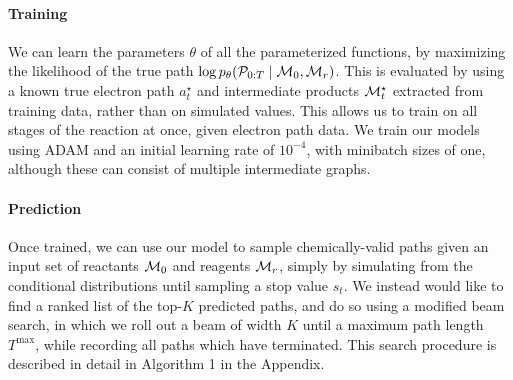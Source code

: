 \paragraph{Training}
We can learn the parameters $\theta$ of all the parameterized functions, by maximizing the likelihood of the true path $\log p_\theta({\mathcal{P}}_{0:T} \mid {\mathcal{M}}_0, {\mathcal{M}}_r)$.
This is evaluated by using a known true electron path $a_t^\star$ and intermediate products ${\mathcal{M}}_t^\star$ extracted from training data,
rather than on simulated values. 
This allows us to train on all stages of the reaction at once, given electron path data.
We train our models using ADAM \citep{kingma2014adam} and an initial learning rate of $10^{-4}$,
with minibatch sizes of one, although these can consist of multiple intermediate graphs.

\paragraph{Prediction}
Once trained, we can use our model to sample chemically-valid paths given an input set of reactants ${\mathcal{M}}_0$ and reagents ${\mathcal{M}}_r$, 
simply by simulating from the conditional distributions until sampling a stop value $s_t$.
We instead would like to find a ranked list of the top-$K$ predicted paths, and do so using a modified beam search,
in which we roll out a beam of width $K$ until a maximum path length $T^\mathrm{max}$,
while recording all paths which have terminated.
This search procedure is described in detail in Algorithm 1 in the Appendix.



